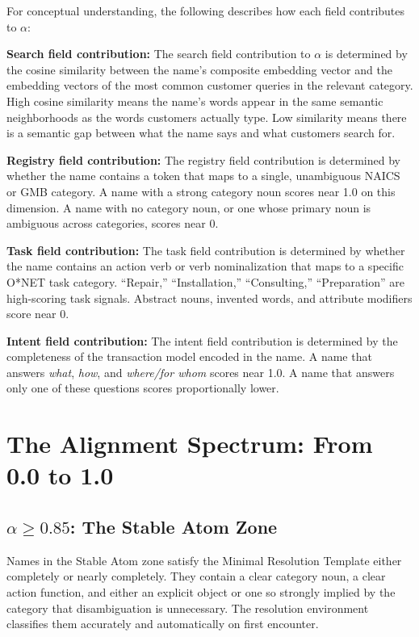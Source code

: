 \documentclass[12pt, openany]{book}
\theoremstyle{thmstyle}
\theoremstyle{defstyle}
\begin{document}
For conceptual understanding, the following describes how each field contributes to $\alpha$:

\textbf{Search field contribution:} The search field contribution to $\alpha$ is determined by the cosine similarity between the name's composite embedding vector and the embedding vectors of the most common customer queries in the relevant category. High cosine similarity means the name's words appear in the same semantic neighborhoods as the words customers actually type. Low similarity means there is a semantic gap between what the name says and what customers search for.

\textbf{Registry field contribution:} The registry field contribution is determined by whether the name contains a token that maps to a single, unambiguous NAICS or GMB category. A name with a strong category noun scores near 1.0 on this dimension. A name with no category noun, or one whose primary noun is ambiguous across categories, scores near 0.

\textbf{Task field contribution:} The task field contribution is determined by whether the name contains an action verb or verb nominalization that maps to a specific O*NET task category. ``Repair,'' ``Installation,'' ``Consulting,'' ``Preparation'' are high-scoring task signals. Abstract nouns, invented words, and attribute modifiers score near 0.

\textbf{Intent field contribution:} The intent field contribution is determined by the completeness of the transaction model encoded in the name. A name that answers \textit{what}, \textit{how}, and \textit{where/for whom} scores near 1.0. A name that answers only one of these questions scores proportionally lower.

\section{The Alignment Spectrum: From 0.0 to 1.0}

\subsection{$\alpha \geq 0.85$: The Stable Atom Zone}

Names in the Stable Atom zone satisfy the Minimal Resolution Template either completely or nearly completely. They contain a clear category noun, a clear action function, and either an explicit object or one so strongly implied by the category that disambiguation is unnecessary. The resolution environment classifies them accurately and automatically on first encounter.
\end{document}
